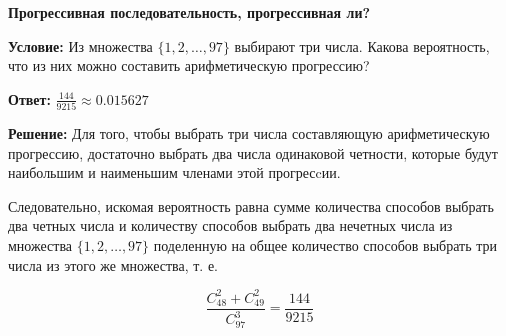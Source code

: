 \documentclass{exam}
\begin{document}
    
\textbf{Прогрессивная последовательность, прогрессивная ли?}

\textbf{Условие:} Из множества $\{1,2,\dots,97\}$ выбирают три числа. Какова вероятность, что из них можно составить арифметическую прогрессию?

\textbf{Ответ:} $\frac{144}{9215} \approx 0.015627$

\textbf{Решение:} Для того, чтобы выбрать три числа составляющую арифметическую прогрессию, достаточно выбрать два числа одинаковой четности, которые будут наибольшим и наименьшим членами этой прогресcии.

Следовательно, искомая вероятность равна сумме количества способов выбрать два четных числа и количеству способов выбрать два нечетных числа из множества $\{1,2,\dots,97\}$ поделенную на общее количество способов выбрать три числа из этого же множества, т. е.

$$\frac{C_{48}^{2} + C_{49}^{2}}{C_{97}^{3}} = \frac{144}{9215}$$
\end{document}

